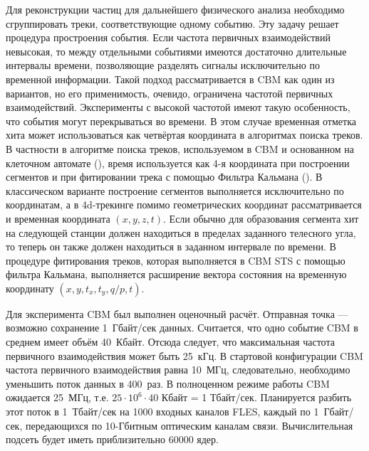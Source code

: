 Для реконструкции частиц для дальнейшего физического анализа необходимо сгруппировать треки, соответствующие одному событию. Эту задачу решает процедура простроения события.
Если частота первичных взаимодействий невысокая, то между отдельными событиями имеются достаточно длительные интервалы времени, позволяющие разделять сигналы исключительно по временной информации. Такой подход рассматривается в CBM как один из вариантов, но его применимость, очевидо, ограничена частотой первичных взаимодействий.
Эксперименты с высокой частотой имеют такую особенность, что события могут перекрываться во времени. В этом случае временная отметка хита может использоваться как четвёртая координата в алгоритмах поиска треков.
В частности в алгоритме поиска треков, используемом в CBM и основанном на клеточном автомате (\cite{AkishinaCA}), время используется как 4-я координата при построении сегментов и при фитировании трека с помощью Фильтра Кальмана (\cite{}).
В классическом варианте построение сегментов выполняется исключительно по координатам, а в 4d-трекинге помимо геометрических координат рассматривается и временная координата $(x, y, z, t)$. Если обычно для образования сегмента хит на следующей станции должен находиться в пределах заданного телесного угла, то теперь он также должен находиться в заданном интервале по времени.
В процедуре фитирования треков, которая выполняется в CBM STS с помощью фильтра Кальмана, выполняется расширение вектора состояния на временную координату $(x, y, t_{x}, t_{y}, q/p, t)$.

Для эксперимента CBM был выполнен оценочный расчёт. Отправная точка --- возможно сохранение 1~Гбайт/сек данных. Считается, что одно событие CBM в среднем имеет объём 40~Кбайт. Отсюда следует, что максимальная частота первичного взаимодействия может быть 25~кГц. В стартовой конфигурации CBM частота первичного взаимодействия равна 10~МГц, следовательно, необходимо уменьшить поток данных в 400~раз. В полноценном режиме работы CBM ожидается 25~МГц, т.е. $ 25 \cdot 10^{6} \cdot 40 $ Кбайт = 1 Тбайт/сек. Планируется разбить этот поток в 1~Тбайт/сек на 1000 входных каналов FLES, каждый по 1~Гбайт/сек, передающихся по 10-Гбитным оптическим каналам связи. Вычислительная подсеть будет иметь приблизительно 60000 ядер.


